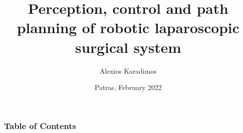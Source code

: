 \documentclass[10pt]{beamer}
\title[]{Perception, control and path planning of robotic laparoscopic surgical system}
\author{Alexios Karadimos}
\institute[ECE U. Patras]{Deparment of Electrical and Computer Engineering}
\date{Patras, February 2022}
\begin{document}


\frame{\titlepage}

\begin{frame}
\frametitle{Table of Contents}
\tableofcontents
\end{frame}











\end{document}
